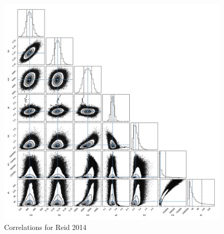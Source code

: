 \documentclass[fleqn,usenatbib]{mnras}
\begin{document}
\begin{figure}
\includegraphics[width=\columnwidth]{Model_III/Plots/Sofue(2009)/emcee_corner_10000_100.pdf}
\caption{Correlations for Reid 2014
}
\label{fig:Model3_Reid2014}
\end{figure}
\bsp	%
\label{lastpage}
\end{document}
